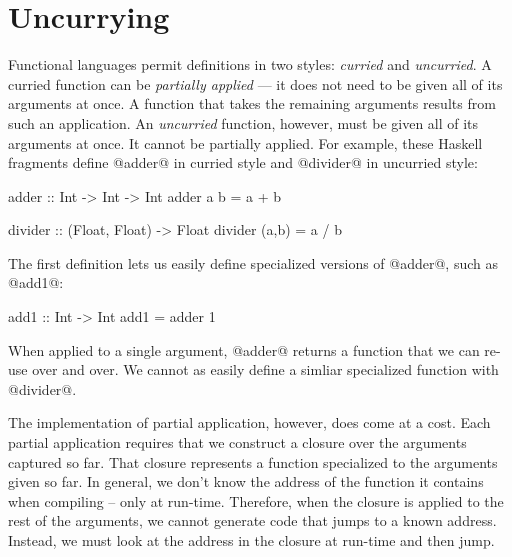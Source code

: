 \documentclass[12pt]{report}
\begin{document}


\chapter{Uncurrying}
\label{ref_chapter_uncurrying}

Functional languages permit definitions in two styles: \emph{curried}
and \emph{uncurried}. A curried function can be \emph{partially
  applied} --- it does not need to be given all of its arguments at
once. A function that takes the remaining arguments results from such
an application. An \emph{uncurried} function, however, must be given
all of its arguments at once. It cannot be partially applied. For
example, these Haskell fragments define @adder@ in curried style and
@divider@ in uncurried style:

\begin{code}
adder :: Int -> Int -> Int
adder a b = a + b

divider :: (Float, Float) -> Float
divider (a,b) = a / b
\end{code}

\noindent
The first definition lets us easily define specialized versions of @adder@, 
such as @add1@:

\begin{code}
add1 :: Int -> Int
add1 = adder 1
\end{code}

When applied to a single argument, @adder@ returns a function that we can re-use over and over. We cannot as easily define a simliar specialized function with @divider@.

The implementation of partial application, however, does come at a
cost. Each partial application requires that we construct a closure
over the arguments captured so far. That closure represents a function specialized
to the arguments given so far. In general, we don't know the address of the function
it contains when compiling -- only at run-time. Therefore, when the closure is
applied to the rest of the arguments, we cannot generate code that jumps to a
known address. Instead, we must look at the address in the closure at run-time and 
then jump. 
\end{document}
